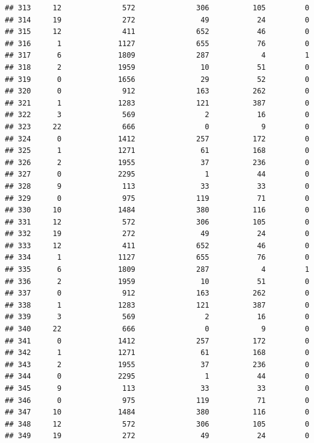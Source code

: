 \documentclass[
]{article}
\begin{document}
\begin{verbatim}
## 313     12              572              306          105         0
## 314     19              272               49           24         0
## 315     12              411              652           46         0
## 316      1             1127              655           76         0
## 317      6             1809              287            4         1
## 318      2             1959               10           51         0
## 319      0             1656               29           52         0
## 320      0              912              163          262         0
## 321      1             1283              121          387         0
## 322      3              569                2           16         0
## 323     22              666                0            9         0
## 324      0             1412              257          172         0
## 325      1             1271               61          168         0
## 326      2             1955               37          236         0
## 327      0             2295                1           44         0
## 328      9              113               33           33         0
## 329      0              975              119           71         0
## 330     10             1484              380          116         0
## 331     12              572              306          105         0
## 332     19              272               49           24         0
## 333     12              411              652           46         0
## 334      1             1127              655           76         0
## 335      6             1809              287            4         1
## 336      2             1959               10           51         0
## 337      0              912              163          262         0
## 338      1             1283              121          387         0
## 339      3              569                2           16         0
## 340     22              666                0            9         0
## 341      0             1412              257          172         0
## 342      1             1271               61          168         0
## 343      2             1955               37          236         0
## 344      0             2295                1           44         0
## 345      9              113               33           33         0
## 346      0              975              119           71         0
## 347     10             1484              380          116         0
## 348     12              572              306          105         0
## 349     19              272               49           24         0

\end{verbatim}
\end{document}
